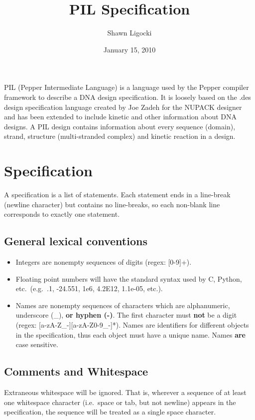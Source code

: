 \documentclass{article}
\begin{document}
\title{PIL Specification}
\author{Shawn Ligocki}
\date{January 15, 2010}
\maketitle

PIL (Pepper Intermediate Language) is a language used by the Pepper
compiler framework to describe a DNA design specification. It is loosely
based on the .des design specification language created by Joe Zadeh
for the NUPACK designer and has been extended to include kinetic and
other information about DNA designs. A PIL design contains information
about every sequence (domain), strand, structure (multi-stranded complex)
and kinetic reaction in a design.


\section{Specification}

A specification is a list of statements. Each statement ends in a
line-break (newline character) but contains no line-breaks, so each non-blank line corresponds to exactly one statement.


\subsection{General lexical conventions}
\begin{itemize}
\item Integers are nonempty sequences of digits (regex: [0-9]+).

\item Floating point numbers will have the standard syntax used by C, Python, etc.\ (e.g.\ .1, -24.551, 1e6, 4.2E12, 1.1e-05, etc.).

\item Names are nonempty sequences of characters which are alphanumeric, underscore (\_), \textbf{or hyphen (-)}. The first character must \textbf{not} be a digit (regex: [a-zA-Z\_-][a-zA-Z0-9\_-]*). Names are identifiers for different objects in the specification, thus each object must have a unique name. Names \textbf{are} case sensitive.
\end{itemize}


\subsection{Comments and Whitespace}

Extraneous whitespace will be ignored. That is, wherever a sequence of at least one whitespace character (i.e.\ space or tab, but not newline) appears in the specification, the sequence will be treated as a single space character.
\end{document}
